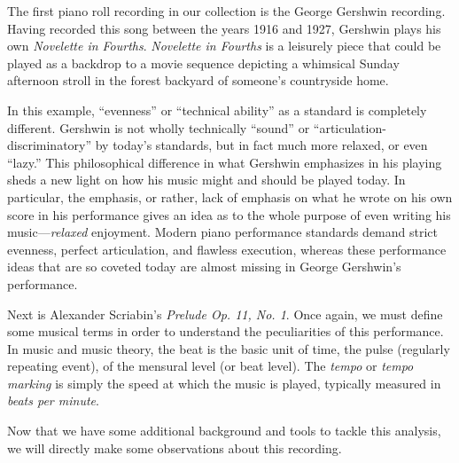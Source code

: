 \documentclass[titlepage,14pt]{article}
\begin{document}
\begin{doublespace}
The first piano roll recording in our collection is the George Gershwin recording. Having recorded this song between the years 1916 and 1927, Gershwin plays his own \textit{Novelette in Fourths}.\autocite{gershwin} \textit{Novelette in Fourths} is a leisurely piece that could be played as a backdrop to a movie sequence depicting a whimsical Sunday afternoon stroll in the forest backyard of someone's countryside home.

In this example, ``evenness'' or ``technical ability'' as a standard is completely different. Gershwin is not wholly technically ``sound'' or ``articulation-discriminatory'' by today's standards, but in fact much more relaxed, or even ``lazy.'' This philosophical difference in what Gershwin emphasizes in his playing sheds a new light on how his music might and should be played today.
In particular, the emphasis, or rather, lack of emphasis on what he wrote on his own score in his performance gives an idea as to the whole purpose of even writing his music---\textit{relaxed} enjoyment. Modern piano performance standards demand strict evenness, perfect articulation, and flawless execution, whereas these performance ideas that are so coveted today are almost missing in George Gershwin's performance. %

Next is Alexander Scriabin's \textit{Prelude Op. 11, No. 1}. \autocite{scriabin} Once again, we must define some musical terms in order to understand the peculiarities of this performance. 
In music and music theory, the beat is the basic unit of time, the pulse (regularly repeating event), of the mensural level (or beat level). The \textit{tempo} or \textit{tempo marking} is simply the speed at which the music is played, typically measured in \textit{beats per minute}.

Now that we have some additional background and tools to tackle this analysis, we will directly make some observations about this recording. 


\end{doublespace}
\end{document}
